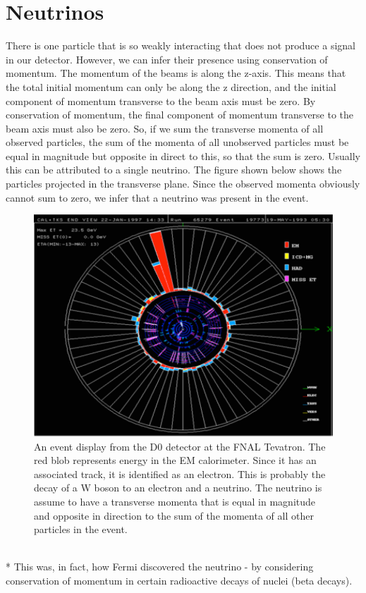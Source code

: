\section{Neutrinos}
There is one particle that is so weakly interacting that does not produce a signal in our detector. However, we can infer their presence using conservation of momentum. The momentum of the beams is along the z-axis. This means that the total initial momentum can only be along the z direction, and the initial component of momentum transverse to the beam axis must be zero. By conservation of momentum, the final component of momentum transverse to the beam axis must also be zero.  So, if we sum the transverse momenta of all observed particles, the sum of the momenta of all unobserved particles must be equal in magnitude but opposite in direct to this, so that the sum is zero.  Usually this can be attributed to a single neutrino. The figure shown below shows the particles projected in the transverse plane. Since the observed momenta obviously cannot sum to zero, we infer that a neutrino was present in the event.
\begin{figure}[h]
\centering\includegraphics[scale=0.4]{./particleID/Pictures/fig4.pdf}
\caption{\small An event display from the D0 detector at the FNAL Tevatron.  The red blob represents energy in the EM calorimeter.  Since it has an associated track, it is identified as an electron. This is probably the decay of a W boson to an electron and a neutrino. The neutrino is assume to have a transverse momenta that is equal in magnitude and opposite in direction to the sum of the momenta of all other particles in the event.}
\label{fig:pdgdedx}
\end{figure}
\\*
This was, in fact, how Fermi discovered the neutrino - by considering conservation of momentum in certain radioactive decays of nuclei (beta decays). 
\newpage
